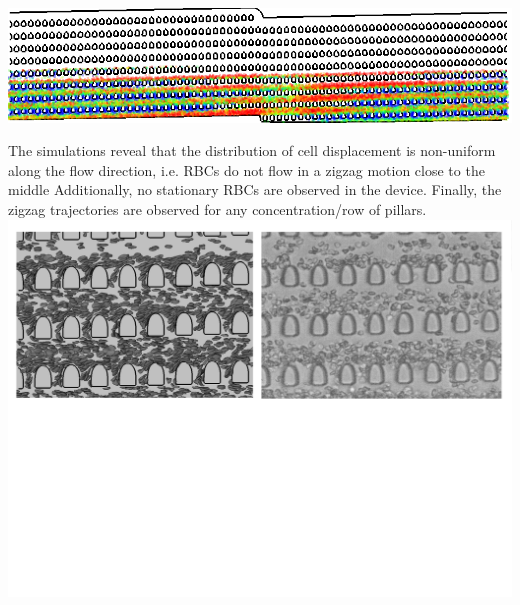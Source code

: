 \includegraphics[width=\textwidth]{i/pach/disp.png}
\eframe

The simulations reveal that the distribution of cell displacement is
non-uniform along the flow direction, i.e. RBCs do not flow in a
zigzag motion close to the middle Additionally, no stationary RBCs are
observed in the device.  Finally, the zigzag trajectories are observed
for any concentration/row of pillars.
\includegraphics[width=\textwidth]{i/pach/comp.pdf}
\eframe
